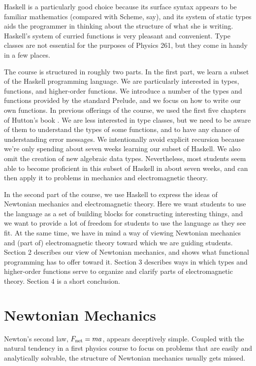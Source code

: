 \documentclass[11pt]{article}
\begin{document}
Haskell is a particularly good choice because its surface syntax appears to
be familiar mathematics (compared with Scheme, say), and its system
of static types aids the programmer in thinking about the structure
of what she is writing.  Haskell's system of curried functions is
very pleasant and convenient.
Type classes are not essential for the purposes
of Physics 261, but they come in handy in a few places.

The course is structured in roughly two parts.  In the first part, we learn a subset
of the Haskell programming language.
We are particularly interested in types, functions, and higher-order functions.
We introduce a number of the types and functions provided by the standard Prelude,
and we focus on how to write our own functions.
In previous offerings of the course, we used the first five chapters
of Hutton's book \cite{hutton07}.
We are less interested in type classes, but we need to be aware of them
to understand the types of some functions, and to have any chance of understanding
error messages.  We intentionally avoid explicit recursion because we're
only spending about seven weeks learning our subset of Haskell.
We also omit the creation of new algebraic data types.
Nevertheless, most students seem able to become proficient in this subset
of Haskell in about seven weeks, and can then apply it to problems
in mechanics and electromagnetic theory.

In the second part of the course, we use Haskell
to express the ideas of Newtonian mechanics and electromagnetic theory.
Here we want students to use the language as a set of building blocks
for constructing interesting things, and we want to provide a lot of freedom
for students to use the language as they see fit.
At the same time, we have in mind
a way of viewing Newtonian mechanics and (part of) electromagnetic theory
toward which we are guiding students.
Section 2 describes our view of Newtonian mechanics, and shows
what functional programming has to offer toward it.
Section 3 describes ways in which types and higher-order functions
serve to organize and clarify parts of electromagnetic theory.
Section 4 is a short conclusion.

\section{Newtonian Mechanics}

Newton's second law, $F_{\rm net} = m a$, appears deceptively simple.
Coupled with the natural tendency in a first physics course
to focus on problems that are easily and analytically solvable,
the structure of Newtonian mechanics usually gets missed.
\end{document}
